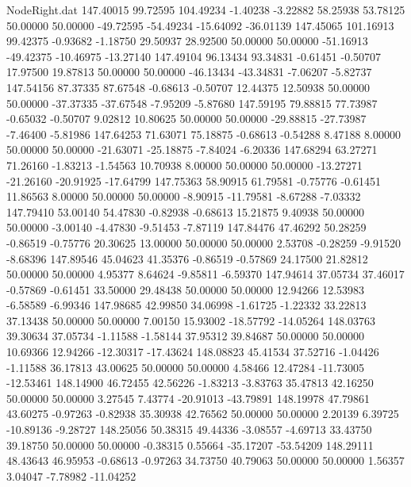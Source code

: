 \begin{filecontents}{NodeRight.dat}
 147.40015   99.72595  104.49234    -1.40238   -3.22882   58.25938   53.78125   50.00000   50.00000  -49.72595  -54.49234  -15.64092  -36.01139
 147.45065  101.16913   99.42375    -0.93682   -1.18750   29.50937   28.92500   50.00000   50.00000  -51.16913  -49.42375  -10.46975  -13.27140
 147.49104   96.13434   93.34831    -0.61451   -0.50707   17.97500   19.87813   50.00000   50.00000  -46.13434  -43.34831   -7.06207   -5.82737
 147.54156   87.37335   87.67548    -0.68613   -0.50707   12.44375   12.50938   50.00000   50.00000  -37.37335  -37.67548   -7.95209   -5.87680
 147.59195   79.88815   77.73987    -0.65032   -0.50707    9.02812   10.80625   50.00000   50.00000  -29.88815  -27.73987   -7.46400   -5.81986
 147.64253   71.63071   75.18875    -0.68613   -0.54288    8.47188    8.00000   50.00000   50.00000  -21.63071  -25.18875   -7.84024   -6.20336
 147.68294   63.27271   71.26160    -1.83213   -1.54563   10.70938    8.00000   50.00000   50.00000  -13.27271  -21.26160  -20.91925  -17.64799
 147.75363   58.90915   61.79581    -0.75776   -0.61451   11.86563    8.00000   50.00000   50.00000   -8.90915  -11.79581   -8.67288   -7.03332
 147.79410   53.00140   54.47830    -0.82938   -0.68613   15.21875    9.40938   50.00000   50.00000   -3.00140   -4.47830   -9.51453   -7.87119
 147.84476   47.46292   50.28259    -0.86519   -0.75776   20.30625   13.00000   50.00000   50.00000    2.53708   -0.28259   -9.91520   -8.68396
 147.89546   45.04623   41.35376    -0.86519   -0.57869   24.17500   21.82812   50.00000   50.00000    4.95377    8.64624   -9.85811   -6.59370
 147.94614   37.05734   37.46017    -0.57869   -0.61451   33.50000   29.48438   50.00000   50.00000   12.94266   12.53983   -6.58589   -6.99346
 147.98685   42.99850   34.06998    -1.61725   -1.22332   33.22813   37.13438   50.00000   50.00000    7.00150   15.93002  -18.57792  -14.05264
 148.03763   39.30634   37.05734    -1.11588   -1.58144   37.95312   39.84687   50.00000   50.00000   10.69366   12.94266  -12.30317  -17.43624
 148.08823   45.41534   37.52716    -1.04426   -1.11588   36.17813   43.00625   50.00000   50.00000    4.58466   12.47284  -11.73005  -12.53461
 148.14900   46.72455   42.56226    -1.83213   -3.83763   35.47813   42.16250   50.00000   50.00000    3.27545    7.43774  -20.91013  -43.79891
 148.19978   47.79861   43.60275    -0.97263   -0.82938   35.30938   42.76562   50.00000   50.00000    2.20139    6.39725  -10.89136   -9.28727
 148.25056   50.38315   49.44336    -3.08557   -4.69713   33.43750   39.18750   50.00000   50.00000   -0.38315    0.55664  -35.17207  -53.54209
 148.29111   48.43643   46.95953    -0.68613   -0.97263   34.73750   40.79063   50.00000   50.00000    1.56357    3.04047   -7.78982  -11.04252

\end{filecontents}
